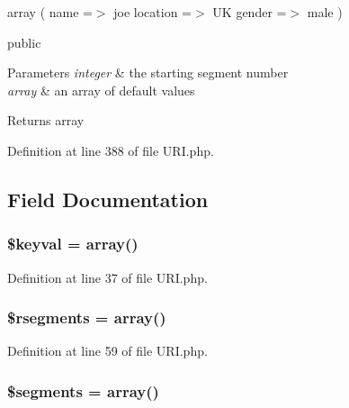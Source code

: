array ( name =$>$ joe location =$>$ U\-K gender =$>$ male )

public 
\begin{DoxyParams}{Parameters}
{\em integer} & the starting segment number \\
\hline
{\em array} & an array of default values \\
\hline
\end{DoxyParams}
\begin{DoxyReturn}{Returns}
array 
\end{DoxyReturn}


Definition at line 388 of file U\-R\-I.\-php.



\subsection{Field Documentation}
\hypertarget{class_c_i___u_r_i_ae15942155aae4760439f552ad1fc3c34}{
\subsubsection[{\$keyval}]{\setlength{\rightskip}{0pt plus 5cm}\$keyval = array()}}\label{class_c_i___u_r_i_ae15942155aae4760439f552ad1fc3c34}


Definition at line 37 of file U\-R\-I.\-php.

\hypertarget{class_c_i___u_r_i_abf60189292b5fda02cdf36e5d7417a33}{
\subsubsection[{\$rsegments}]{\setlength{\rightskip}{0pt plus 5cm}\$rsegments = array()}}\label{class_c_i___u_r_i_abf60189292b5fda02cdf36e5d7417a33}


Definition at line 59 of file U\-R\-I.\-php.

\hypertarget{class_c_i___u_r_i_a8d7f597e2b6cf2aaef663822d1b96a82}{
\subsubsection[{\$segments}]{\setlength{\rightskip}{0pt plus 5cm}\$segments = array()}}\label{class_c_i___u_r_i_a8d7f597e2b6cf2aaef663822d1b96a82}


